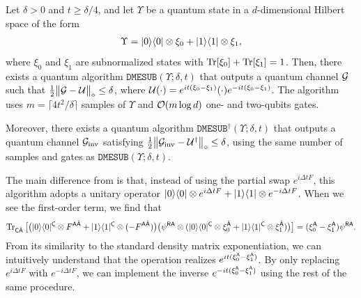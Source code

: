 \begin{proposition}
\label{prevthm:DME variant}
Let $\delta > 0$ and $t \geq \delta/4$, and let $\Upsilon$ be a quantum state in a $d$-dimensional Hilbert space of the form  
\begin{align}
    \Upsilon = |0\rangle\langle0| \otimes \xi_0 + |1\rangle\langle1| \otimes \xi_1,
\end{align}
where $\xi_0$ and $\xi_1$ are subnormalized states with $\operatorname{Tr}[\xi_0] + \operatorname{Tr}[\xi_1] = 1$. 
Then, there exists a quantum algorithm $\mathtt{DMESUB}(\Upsilon;\delta, t)$ that outputs a quantum channel ${\mathcal{G}}$ such that $\frac{1}{2} \big\|{\mathcal{G}} - {\mathcal{U}}\big\|_\diamond \leq \delta$, where ${\mathcal{U}}(\cdot) = e^{it(\xi_0 - \xi_1)}(\cdot)e^{-it(\xi_0 - \xi_1)}$.
The algorithm uses $m = \lceil 4t^2/\delta\rceil$ samples of $\Upsilon$ and ${\mathcal{O}}(m\log{d})$ one- and two-qubits gates.

Moreover, there exists a quantum algorithm $\mathtt{DMESUB}^\dag(\Upsilon; \delta, t)$ that outputs a quantum channel ${\mathcal{G}}_{\rm inv}$ satisfying $\frac{1}{2} \big\|{\mathcal{G}}_{\rm inv} - {\mathcal{U}}^\dag \big\|_\diamond \leq \delta$, using the same number of samples and gates as $\mathtt{DMESUB}(\Upsilon; \delta, t)$.
\end{proposition}


The main difference from  is that, instead of using the partial swap $e^{i\Delta t F}$, this algorithm adopts a unitary operator $|0\rangle\langle0| \otimes e^{i\Delta t F} + |1\rangle\langle1| \otimes e^{-i\Delta t F}$.
When we see the first-order term, we find that
\begin{align}
    \operatorname{Tr}_{{\mathsf{C}}\hat{{\mathsf{A}}}}\big[\big(|0\rangle\langle0|^{\mathsf{C}} \otimes F^{{\mathsf{A}}\hat{{\mathsf{A}}}}
    + |1\rangle\langle1|^{\mathsf{C}} \otimes (-F^{{\mathsf{A}}\hat{{\mathsf{A}}}})\big) \big(\psi^{{\mathsf{R}}{\mathsf{A}}}\otimes (|0\rangle\langle0|^{\mathsf{C}} \otimes \xi_0^{\hat{{\mathsf{A}}}} + |1\rangle\langle1|^{\mathsf{C}} \otimes \xi_1^{\hat{{\mathsf{A}}}})\big)\big]
    = (\xi_0^{\mathsf{A}} - \xi_1^{\mathsf{A}})\psi^{{\mathsf{R}}{\mathsf{A}}}.
\end{align}
From its similarity to the standard density matrix exponentiation, we can intuitively understand that the operation realizes $e^{it(\xi_0^{\mathsf{A}} - \xi_1^{\mathsf{A}})}$.
By only replacing $e^{i\Delta t F}$ with $e^{-i\Delta t F}$, we can implement the inverse $e^{-it(\xi_0^{\mathsf{A}} - \xi_1^{\mathsf{A}})}$ using the rest of the same procedure.






